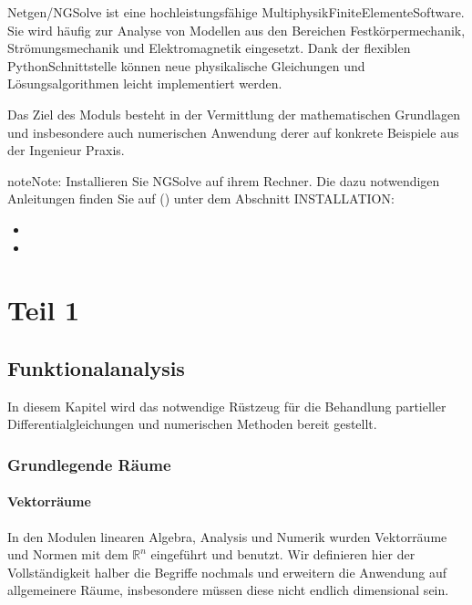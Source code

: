 \documentclass[letterpaper,10pt,english]{jupyterBook}
\begin{document}
Netgen/NGSolve ist eine hochleistungsfähige Multiphysik\sphinxhyphen{}Finite\sphinxhyphen{}Elemente\sphinxhyphen{}Software. Sie wird häufig zur Analyse von Modellen aus den Bereichen Festkörpermechanik, Strömungsmechanik und Elektromagnetik eingesetzt. Dank der flexiblen Python\sphinxhyphen{}Schnittstelle können neue physikalische Gleichungen und Lösungsalgorithmen leicht implementiert werden.

Das Ziel des Moduls besteht in der Vermittlung der mathematischen Grundlagen und insbesondere auch numerischen Anwendung derer auf konkrete Beispiele aus der Ingenieur Praxis.

\begin{sphinxadmonition}{note}{Note:}
Installieren Sie NGSolve auf ihrem Rechner. Die dazu notwendigen Anleitungen finden Sie auf () unter dem Abschnitt INSTALLATION:
\begin{itemize}
\item {} 

\item {} 

\end{itemize}
\end{sphinxadmonition}


\part{Teil 1}


\chapter{Funktionalanalysis}
\label{\detokenize{Funktionalanalysis/Funktionalanalysis:funktionalanalysis}}\label{\detokenize{Funktionalanalysis/Funktionalanalysis::doc}}
In diesem Kapitel wird das notwendige Rüstzeug für die Behandlung partieller Differentialgleichungen und numerischen Methoden bereit gestellt.


\section{Grundlegende Räume}
\label{\detokenize{Funktionalanalysis/Funktionalanalysis:grundlegende-raume}}

\subsection{Vektorräume}
\label{\detokenize{Funktionalanalysis/Funktionalanalysis:vektorraume}}
In den Modulen linearen Algebra, Analysis und Numerik wurden Vektorräume und Normen mit dem \(\mathbb{R}^n\) eingeführt und benutzt. Wir definieren hier der Vollständigkeit halber die Begriffe nochmals und erweitern die Anwendung auf allgemeinere Räume, insbesondere müssen diese nicht endlich dimensional sein.
\end{document}
